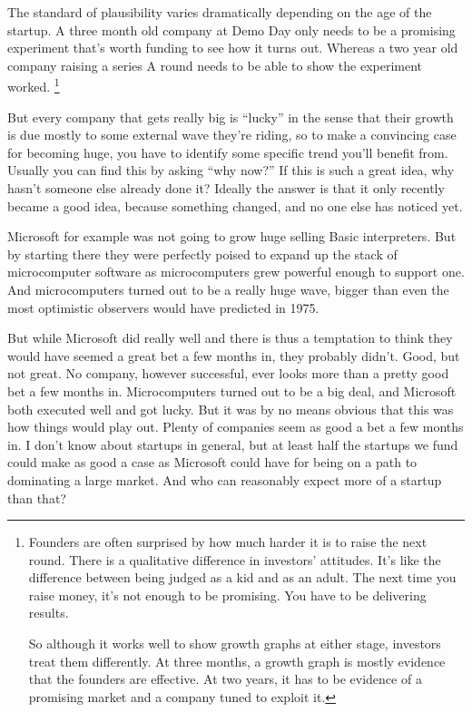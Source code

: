 \documentclass[12pt]{book}
\begin{document}
The standard of plausibility varies dramatically depending on the age of
the startup. A three month old company at Demo Day only needs to be a
promising experiment that's worth funding to see how it turns out.
Whereas a two year old company raising a series A round needs to be able
to show the experiment worked. \footnote{Founders are often surprised by how much harder it is to raise
the next round. There is a qualitative difference in investors'
attitudes. It's like the difference between being judged as a kid and as
an adult. The next time you raise money, it's not enough to be
promising. You have to be delivering results.

So although it works well to show growth graphs at either stage,
investors treat them differently. At three months, a growth graph is
mostly evidence that the founders are effective. At two years, it has to
be evidence of a promising market and a company tuned to exploit it.}

But every company that gets really big is ``lucky'' in the sense that
their growth is due mostly to some external wave they're riding, so to
make a convincing case for becoming huge, you have to identify some
specific trend you'll benefit from. Usually you can find this by asking
``why now?'' If this is such a great idea, why hasn't someone else
already done it? Ideally the answer is that it only recently became a
good idea, because something changed, and no one else has noticed yet.

Microsoft for example was not going to grow huge selling Basic
interpreters. But by starting there they were perfectly poised to expand
up the stack of microcomputer software as microcomputers grew powerful
enough to support one. And microcomputers turned out to be a really huge
wave, bigger than even the most optimistic observers would have
predicted in 1975.

But while Microsoft did really well and there is thus a temptation to
think they would have seemed a great bet a few months in, they probably
didn't. Good, but not great. No company, however successful, ever looks
more than a pretty good bet a few months in. Microcomputers turned out
to be a big deal, and Microsoft both executed well and got lucky. But it
was by no means obvious that this was how things would play out. Plenty
of companies seem as good a bet a few months in. I don't know about
startups in general, but at least half the startups we fund could make
as good a case as Microsoft could have for being on a path to dominating
a large market. And who can reasonably expect more of a startup than
that?
\end{document}
